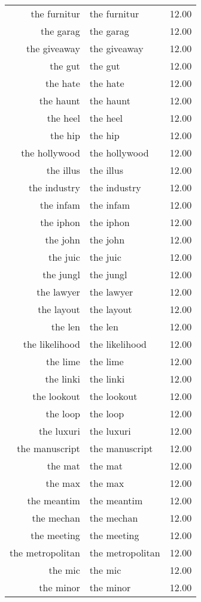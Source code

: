 \begin{table}[ht]
\begin{tabular}{rlr}
  the furnitur & the furnitur & 12.00 \\ 
  the garag & the garag & 12.00 \\ 
  the giveaway & the giveaway & 12.00 \\ 
  the gut & the gut & 12.00 \\ 
  the hate & the hate & 12.00 \\ 
  the haunt & the haunt & 12.00 \\ 
  the heel & the heel & 12.00 \\ 
  the hip & the hip & 12.00 \\ 
  the hollywood & the hollywood & 12.00 \\ 
  the illus & the illus & 12.00 \\ 
  the industry & the industry & 12.00 \\ 
  the infam & the infam & 12.00 \\ 
  the iphon & the iphon & 12.00 \\ 
  the john & the john & 12.00 \\ 
  the juic & the juic & 12.00 \\ 
  the jungl & the jungl & 12.00 \\ 
  the lawyer & the lawyer & 12.00 \\ 
  the layout & the layout & 12.00 \\ 
  the len & the len & 12.00 \\ 
  the likelihood & the likelihood & 12.00 \\ 
  the lime & the lime & 12.00 \\ 
  the linki & the linki & 12.00 \\ 
  the lookout & the lookout & 12.00 \\ 
  the loop & the loop & 12.00 \\ 
  the luxuri & the luxuri & 12.00 \\ 
  the manuscript & the manuscript & 12.00 \\ 
  the mat & the mat & 12.00 \\ 
  the max & the max & 12.00 \\ 
  the meantim & the meantim & 12.00 \\ 
  the mechan & the mechan & 12.00 \\ 
  the meeting & the meeting & 12.00 \\ 
  the metropolitan & the metropolitan & 12.00 \\ 
  the mic & the mic & 12.00 \\ 
  the minor & the minor & 12.00 \\ 

\end{tabular}
\end{table}
